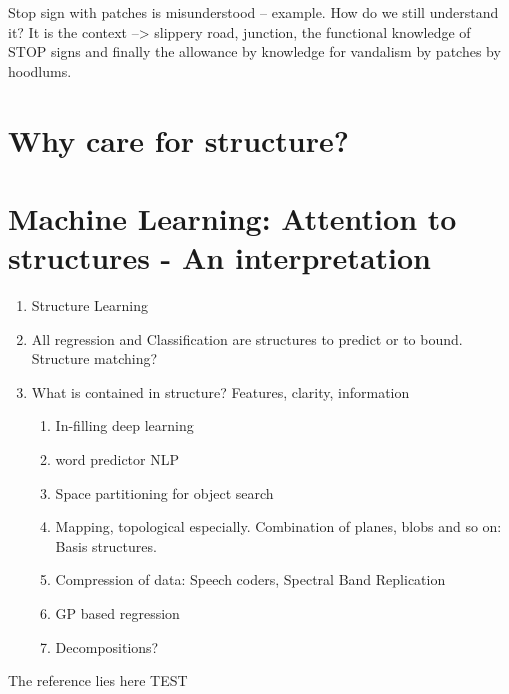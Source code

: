 Stop sign with patches is misunderstood -- example. How do we still understand it? It is the context --> slippery road, junction, the functional knowledge of STOP signs and finally the allowance by knowledge for vandalism by patches by hoodlums.

\section{Why care for structure?}
\section{Machine Learning: Attention to structures - An interpretation}
\begin{enumerate}
\item Structure Learning
\item All regression and Classification are structures to predict or to bound. Structure matching?
\item What is contained in structure? Features, clarity, information
\begin{enumerate}
\item In-filling deep learning
\item word predictor NLP
\item Space partitioning for object search
\item Mapping, topological especially. Combination of planes, blobs and so on: Basis structures.
\item Compression of data: Speech coders, Spectral Band Replication
\item GP based regression
\item Decompositions?
\end{enumerate}
\end{enumerate}

The reference lies here TEST \cite{salakhutdinov2009deep}

